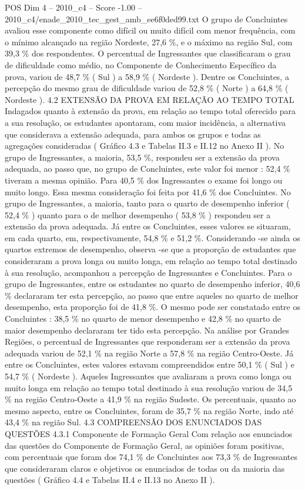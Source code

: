\begin{textsample}{POS Dim 4 – 2010\_c4 – Score -1.00 – 2010\_c4/enade\_2010\_tec\_gest\_amb\_ee6f0ded99.txt}
O grupo de Concluintes avaliou esse componente como difícil ou muito difícil com menor frequência, com o mínimo alcançado na região Nordeste, 27,6 \%, e o máximo na região Sul, com 39,3 \% dos respondentes.
O percentual de Ingressantes que classificaram o grau de dificuldade como médio, no Componente de Conhecimento Específico da prova, variou de 48,7 \% ( Sul ) a 58,9 \% ( Nordeste ).
Dentre os Concluintes, a percepção do mesmo grau de dificuldade variou de 52,8 \% ( Norte ) a 64,8 \% ( Nordeste ). 4.2 EXTENSÃO DA PROVA EM RELAÇÃO AO TEMPO TOTAL Indagados quanto à extensão da prova, em relação ao tempo total oferecido para a sua resolução, os estudantes apontaram, com maior incidência, a alternativa que considerava a extensão adequada, para ambos os grupos e todas as agregações consideradas ( Gráfico 4.3 e Tabelas II.3 e II.12 no Anexo II ).
No grupo de Ingressantes, a maioria, 53,5 \%, respondeu ser a extensão da prova adequada, ao passo que, no grupo de Concluintes, este valor foi menor : 52,4 \% tiveram a mesma opinião.
Para 40,5 \% dos Ingressantes o exame foi longo ou muito longo.
Essa mesma consideração foi feita por 41,6 \% dos Concluintes.
No grupo de Ingressantes, a maioria, tanto para o quarto de desempenho inferior ( 52,4 \% ) quanto para o de melhor desempenho ( 53,8 \% ) respondeu ser a extensão da prova adequada.
Já entre os Concluintes, esses valores se situaram, em cada quarto, em, respectivamente, 54,8 \% e 51,2 \%.
Considerando -se ainda os quartos extremos de desempenho, observa -se que a proporção de estudantes que consideraram a prova longa ou muito longa, em relação ao tempo total destinado à sua resolução, acompanhou a percepção de Ingressantes e Concluintes.
Para o grupo de Ingressantes, entre os estudantes no quarto de desempenho inferior, 40,6 \% declararam ter esta percepção, ao passo que entre aqueles no quarto de melhor desempenho, esta proporção foi de 41,8 \%.
O mesmo pode ser constatado entre os Concluintes : 38,5 \% no quarto de menor desempenho e 42,8 \% no quarto de maior desempenho declararam ter tido esta percepção.
Na análise por Grandes Regiões, o percentual de Ingressantes que responderam ser a extensão da prova adequada variou de 52,1 \% na região Norte a 57,8 \% na região Centro-Oeste.
Já entre os Concluintes, estes valores estavam compreendidos entre 50,1 \% ( Sul ) e 54,7 \% ( Nordeste ).
Aqueles Ingressantes que avaliaram a prova como longa ou muito longa em relação ao tempo total destinado à sua resolução variou de 34,5 \% na região Centro-Oeste a 41,9 \% na região Sudeste.
Os percentuais, quanto ao mesmo aspecto, entre os Concluintes, foram de 35,7 \% na região Norte, indo até 43,4 \% na região Sul. 4.3 COMPREENSÃO DOS ENUNCIADOS DAS QUESTÕES 4.3.1 Componente de Formação Geral Com relação aos enunciados das questões do Componente de Formação Geral, as opiniões foram positivas, com percentuais que foram dos 74,1 \% de Concluintes aos 73,3 \% de Ingressantes que consideraram claros e objetivos os enunciados de todas ou da maioria das questões ( Gráfico 4.4 e Tabelas II.4 e II.13 no Anexo II ).

\end{textsample}
